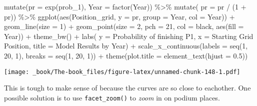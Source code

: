 \documentclass[
]{book}
\newenvironment{Shaded}{\begin{snugshade}}{\end{snugshade}}
\newcommand{\AttributeTok}[1]{\textcolor[rgb]{0.77,0.63,0.00}{#1}}
\newcommand{\DecValTok}[1]{\textcolor[rgb]{0.00,0.00,0.81}{#1}}
\newcommand{\FloatTok}[1]{\textcolor[rgb]{0.00,0.00,0.81}{#1}}
\newcommand{\FunctionTok}[1]{\textcolor[rgb]{0.00,0.00,0.00}{#1}}
\newcommand{\NormalTok}[1]{#1}
\newcommand{\SpecialCharTok}[1]{\textcolor[rgb]{0.00,0.00,0.00}{#1}}
\newcommand{\StringTok}[1]{\textcolor[rgb]{0.31,0.60,0.02}{#1}}
\begin{document}
\begin{Shaded}
\begin{Highlighting}[]
  \FunctionTok{mutate}\NormalTok{(}\AttributeTok{pr =} \FunctionTok{exp}\NormalTok{(prob\_1),}
         \AttributeTok{Year =} \FunctionTok{factor}\NormalTok{(Year)) }\SpecialCharTok{\%\textgreater{}\%} 
  \FunctionTok{mutate}\NormalTok{( }\AttributeTok{pr =}\NormalTok{ pr }\SpecialCharTok{/}\NormalTok{ (}\DecValTok{1} \SpecialCharTok{+}\NormalTok{ pr)) }\SpecialCharTok{\%\textgreater{}\%} 
  \FunctionTok{ggplot}\NormalTok{(}\FunctionTok{aes}\NormalTok{(Position\_grid, }\AttributeTok{y =}\NormalTok{ pr, }\AttributeTok{group  =}\NormalTok{ Year, }\AttributeTok{col =}\NormalTok{ Year)) }\SpecialCharTok{+}
  \FunctionTok{geom\_line}\NormalTok{(}\AttributeTok{size =} \DecValTok{1}\NormalTok{) }\SpecialCharTok{+} 
  \FunctionTok{geom\_point}\NormalTok{(}\AttributeTok{size =} \DecValTok{2}\NormalTok{, }\AttributeTok{pch =} \DecValTok{21}\NormalTok{, }\AttributeTok{col =} \StringTok{\textquotesingle{}black\textquotesingle{}}\NormalTok{, }\FunctionTok{aes}\NormalTok{(}\AttributeTok{fill =}\NormalTok{ Year)) }\SpecialCharTok{+}
  \FunctionTok{theme\_bw}\NormalTok{() }\SpecialCharTok{+}
  \FunctionTok{labs}\NormalTok{( }\AttributeTok{y =} \StringTok{\textquotesingle{}Probability of finishing P1\textquotesingle{}}\NormalTok{,}
        \AttributeTok{x =} \StringTok{\textquotesingle{}Starting Grid Position\textquotesingle{}}\NormalTok{,}
        \AttributeTok{title =} \StringTok{\textquotesingle{}Model Results by Year\textquotesingle{}}\NormalTok{) }\SpecialCharTok{+}
  \FunctionTok{scale\_x\_continuous}\NormalTok{(}\AttributeTok{labels =} \FunctionTok{seq}\NormalTok{(}\DecValTok{1}\NormalTok{, }\DecValTok{20}\NormalTok{, }\DecValTok{1}\NormalTok{),}
                     \AttributeTok{breaks =} \FunctionTok{seq}\NormalTok{(}\DecValTok{1}\NormalTok{, }\DecValTok{20}\NormalTok{, }\DecValTok{1}\NormalTok{)) }\SpecialCharTok{+}
  \FunctionTok{theme}\NormalTok{(}\AttributeTok{plot.title =} \FunctionTok{element\_text}\NormalTok{(}\AttributeTok{hjust =} \FloatTok{0.5}\NormalTok{))}
\end{Highlighting}
\end{Shaded}

\texttt{[image: \_book/The-book\_files/figure-latex/unnamed-chunk-148-1.pdf]}

This is tough to make sense of because the curves are so close to eachother. One possible solution is to use \texttt{facet\_zoom()} to \emph{zoom} in on podium places.
\end{document}
